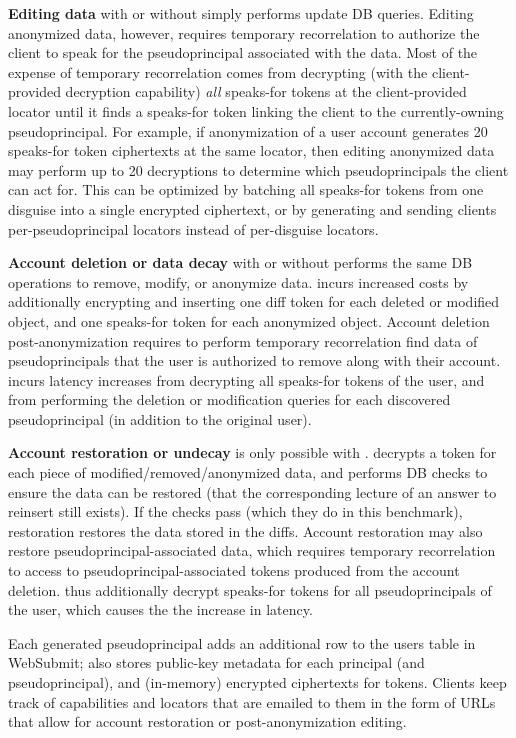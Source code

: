 \textbf{Editing data} with or without \sys simply performs update DB queries. Editing anonymized data,
however, requires temporary recorrelation to authorize the client to speak for the pseudoprincipal
associated with the data.  Most of the expense of temporary recorrelation comes from \sys decrypting
(with the client-provided decryption capability) \emph{all} speaks-for tokens at the client-provided
locator until it finds a speaks-for token linking the client to the currently-owning pseudoprincipal.
For example, if anonymization of a user account generates 20 speaks-for token ciphertexts at the same
locator, then editing anonymized data may perform up to 20 decryptions to
determine which pseudoprincipals the client can act for. This can be optimized by batching all
speaks-for tokens from one disguise into a single encrypted ciphertext, or by generating and sending
clients per-pseudoprincipal locators instead of per-disguise locators.

\textbf{Account deletion or data decay} with or without \sys performs the same DB operations to
remove, modify, or anonymize data.  \sys incurs increased costs by additionally encrypting and
inserting one diff token for each deleted or modified object, and one speaks-for token for each
anonymized object.  Account deletion post-anonymization requires \sys to perform temporary
recorrelation find data of pseudoprincipals that the user is authorized to remove along with their
account.  \sys incurs latency increases from decrypting all speaks-for tokens of the user, and from
performing the deletion or modification queries for each discovered pseudoprincipal (in addition to
the original user).

\textbf{Account restoration or undecay} is only possible with \sys. \sys decrypts a token for each
piece of modified/removed/anonymized data, and performs DB checks to ensure the data can be restored
(\eg that the corresponding lecture of an answer to reinsert still exists). If the checks pass
(which they do in this benchmark), restoration restores the data stored in the diffs. Account
restoration may also restore pseudoprincipal-associated data, which requires temporary recorrelation
to access to pseudoprincipal-associated tokens produced from the account deletion.  \sys thus
additionally decrypt speaks-for tokens for all pseudoprincipals of the user, which causes the the
increase in latency.

Each generated pseudoprincipal adds an additional row to the users table in WebSubmit; \sys also
stores public-key metadata for each principal (and pseudoprincipal), and (in-memory) encrypted
ciphertexts for tokens.  Clients keep track of capabilities and locators that are emailed to them in
the form of URLs that allow for account restoration or post-anonymization editing.

